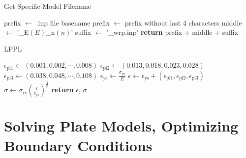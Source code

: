 \begin{algorithm}[tbp]
  \caption{Get Specific Model Filename}
  \label{alg:get_specific_model_filename}
  \begin{algorithmic}
      \State {}
      \State prefix $\gets$ .inp file basename 
      \State prefix $\gets$ prefix without last 4 characters
      \State {}
      \State middle $\gets$ '\_E$(E)$\_n$(n)$'
      \State suffix $\gets$ '\_wrp.inp'
      \State \textbf{return} prefix + middle + suffix
      \State {}
    \EndProcedure
  \end{algorithmic}
\end{algorithm}

\begin{algorithm}[tbp]
  \caption{LPPL}
  \label{alg:lppl}
  \begin{algorithmic}
     
    \State $\epsilon_{\text{pl1}} \gets (0.001, 0.002, \cdots , 0.008)$
    \State $\epsilon_{\text{pl2}} \gets (0.013, 0.018, 0.023, 0.028)$
    \State $\epsilon_{\text{pl3}} \gets (0.038, 0.048, \cdots , 0.108)$
    \State $\epsilon_{\text{ys}} \gets \frac{\sigma_\text{ys}}{E}$
    \State $\epsilon \gets \epsilon_{\text{ys}} + (\epsilon_{\text{pl1}}, \epsilon_{\text{pl2}}, \epsilon_{\text{pl3}})$
    \State $\sigma \gets \sigma_\text{ys}  (\frac{\epsilon}{\epsilon_{\text{ys}}})^{\frac{1}{n}}$
    \State \textbf{return} $\epsilon$, $\sigma$
    \EndProcedure
  \end{algorithmic}
\end{algorithm}

\section{Solving Plate Models, Optimizing Boundary Conditions}
\label{sec:solve}

